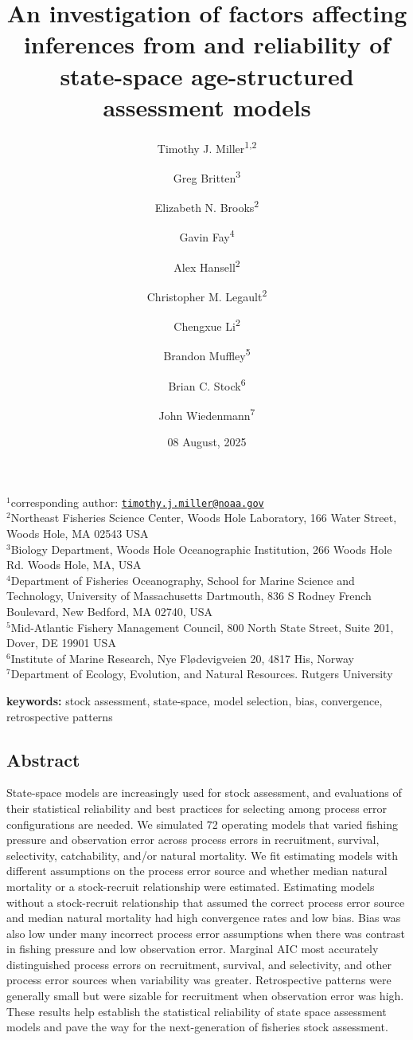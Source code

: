 \documentclass[
  12pt,
]{article}
\title{An investigation of factors affecting inferences from and
reliability of state-space age-structured assessment models}
\author{Timothy J. Miller\textsuperscript{1,2} \and Greg
Britten\textsuperscript{3} \and Elizabeth N.
Brooks\textsuperscript{2} \and Gavin Fay\textsuperscript{4} \and Alex
Hansell\textsuperscript{2} \and Christopher M.
Legault\textsuperscript{2} \and Chengxue
Li\textsuperscript{2} \and Brandon Muffley\textsuperscript{5} \and Brian
C. Stock\textsuperscript{6} \and John Wiedenmann\textsuperscript{7}}
\date{08 August, 2025}
\begin{document}
\maketitle

\(^1\)corresponding author:
\href{mailto:timothy.j.miller@noaa.gov}{\nolinkurl{timothy.j.miller@noaa.gov}}\\
\(^2\)Northeast Fisheries Science Center, Woods Hole Laboratory, 166
Water Street, Woods Hole, MA 02543 USA\\
\(^3\)Biology Department, Woods Hole Oceanographic Institution, 266
Woods Hole Rd. Woods Hole, MA, USA\\
\(^4\)Department of Fisheries Oceanography, School for Marine Science
and Technology, University of Massachusetts Dartmouth, 836 S Rodney
French Boulevard, New Bedford, MA 02740, USA\\
\(^5\)Mid-Atlantic Fishery Management Council, 800 North State Street,
Suite 201, Dover, DE 19901 USA\\
\(^6\)Institute of Marine Research, Nye Flødevigveien 20, 4817 His,
Norway\\
\(^7\)Department of Ecology, Evolution, and Natural Resources. Rutgers
University\\

\pagebreak

\textbf{keywords:} stock assessment, state-space, model selection, bias,
convergence, retrospective patterns

\hypertarget{abstract}{%
\subsection*{Abstract}\label{abstract}}

State-space models are increasingly used for stock assessment, and
evaluations of their statistical reliability and best practices for
selecting among process error configurations are needed. We simulated 72
operating models that varied fishing pressure and observation error
across process errors in recruitment, survival, selectivity,
catchability, and/or natural mortality. We fit estimating models with
different assumptions on the process error source and whether median
natural mortality or a stock-recruit relationship were estimated.
Estimating models without a stock-recruit relationship that assumed the
correct process error source and median natural mortality had high
convergence rates and low bias. Bias was also low under many incorrect
process error assumptions when there was contrast in fishing pressure
and low observation error. Marginal AIC most accurately distinguished
process errors on recruitment, survival, and selectivity, and other
process error sources when variability was greater. Retrospective
patterns were generally small but were sizable for recruitment when
observation error was high. These results help establish the statistical
reliability of state space assessment models and pave the way for the
next-generation of fisheries stock assessment.
\end{document}
